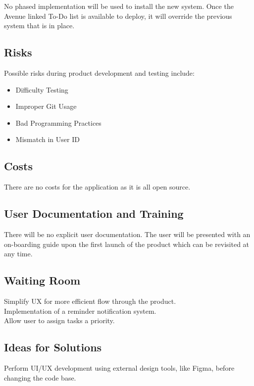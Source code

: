 \documentclass[12pt, titlepage]{article}
\begin{document}
No phased implementation will be used to install the new system. Once the Avenue linked To-Do list is available to deploy, it will override the previous system that is in place.

\subsection{Risks}

Possible risks during product development and testing include:
\begin{itemize}
\item Difficulty Testing
\item Improper Git Usage
\item Bad Programming Practices
\item Mismatch in User ID
\end{itemize}

\subsection{Costs}

There are no costs for the application as it is all open source.

\subsection{User Documentation and Training}

There will be no explicit user documentation. The user will be presented with an on-boarding guide upon the first launch of the product which can be revisited at any time. 

\subsection{Waiting Room}

Simplify UX for more efficient flow through the product.\\
Implementation of a reminder notification system. \\
Allow user to assign tasks a priority. 

\subsection{Ideas for Solutions}

Perform UI/UX development using external design tools, like Figma, before changing the code base. 


\end{document}
